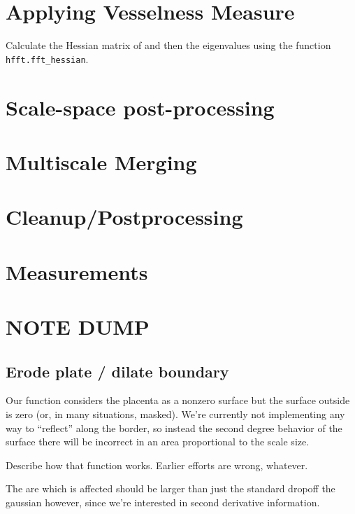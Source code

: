 \section{Applying Vesselness Measure}
Calculate the Hessian matrix of  and then the eigenvalues using the function \texttt{hfft.fft\_hessian}.

\section{Scale-space post-processing}
\section{Multiscale Merging}
\section{Cleanup/Postprocessing}
\section{Measurements}

\section{NOTE DUMP}
	
	\subsection{Erode plate / dilate boundary}
	
	Our function considers the placenta as a nonzero surface but the surface outside is zero (or, in many situations, masked). We're currently not implementing any way to ``reflect'' along the border, so instead the second degree behavior of the surface there will be incorrect in an area proportional to the scale size.
	
	Describe how that function works. Earlier efforts are wrong, whatever.
	
	The are which is affected should be larger than just the standard dropoff the gaussian however, since we're interested
	in second derivative information.
	
	